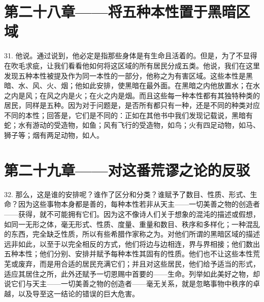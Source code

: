 \section{第二十八章——将五种本性置于黑暗区域}

31. 他说。通过说到，他必定是指那些身体是有生命且活着的。但是，为了不显得在吹毛求疵，让我们看看他如何将这区域的所有居民分成五类。他说，我们在这里发现五种本性被提及作为同一本性的一部分，他称之为有害区域。这些本性是黑暗、水、风、火、烟；他如此安排，使黑暗在最外面。在黑暗之内他放置水；在水之内是风；在风之内是火；在火之内是烟。而且这些每一种本性都有其独特种类的居民，同样是五种。因为对于问题是，是否所有都只有一种，还是不同的种类对应不同的本性；回答是，它们是不同的：正如在其他书中我们发现记载说，黑暗有蛇；水有游动的受造物，如鱼；风有飞行的受造物，如鸟；火有四足动物，如马、狮子等；烟有两足动物，如人。\par


\section{第二十九章——对这番荒谬之论的反驳}

32. 那么，这是谁的安排呢？谁作了区分和分类？谁赋予了数目、性质、形式、生命？因为这些事物本身都是善的，每种本性若非从天主——一切美善之物的创造者——获得，就不可能拥有它们。因为这不像诗人们关于想象的混沌的描述或假想，如同一无形之体，毫无形式、性质、度量、重量和数目、秩序和多样化；一种混乱的东西，完全缺乏性质，所以有些希腊作家称之为。对他们所谓的黑暗区域的描述远非如此，以至于以完全相反的方式，他们将边与边相连，界与界相接；他们数出五种本性；他们分别、安排并赋予每种本性其固有的性质。他们也不让这些本性荒芜或废弃，而是用合适的居民充满它们；并且对这些居民，他们给予适当的形式，适应其居住之所，此外还赋予一切恩赐中首要的——生命。列举如此美好之物，却说它们与天主——一切美善之物的创造者——毫无关系，就是忽略事物中秩序的卓越，以及导至这一结论的错误的巨大危害。\par

